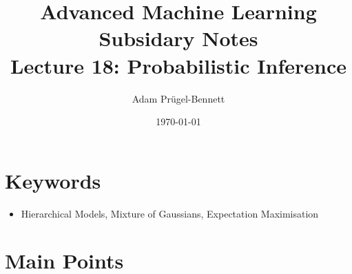 \documentclass[11pt]{article}
\author{Adam Prügel-Bennett}
\date{\today}
\title{Advanced Machine Learning Subsidary Notes\\\medskip
\large Lecture 18: Probabilistic Inference}
\begin{document}
\maketitle


\section{Keywords}
\label{sec:org464c4ed}
\begin{itemize}
\item Hierarchical Models, Mixture of Gaussians, Expectation Maximisation
\end{itemize}


\section{Main Points}
\label{sec:orgc282d15}
\end{document}
